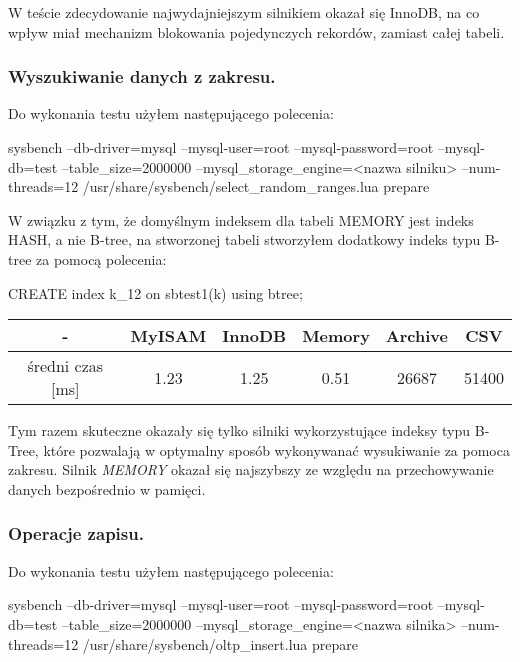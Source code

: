 W teście zdecydowanie najwydajniejszym silnikiem okazał się InnoDB, na co wpływ miał mechanizm blokowania pojedynczych rekordów, zamiast całej tabeli.

\subsubsection{Wyszukiwanie danych z zakresu.}

Do wykonania testu użyłem następującego polecenia:
\begin{spverbatim}
	sysbench --db-driver=mysql --mysql-user=root --mysql-password=root --mysql-db=test --table_size=2000000 --mysql_storage_engine=<nazwa silniku> --num-threads=12 /usr/share/sysbench/select_random_ranges.lua prepare
\end{spverbatim}
W związku z tym, że domyślnym indeksem dla tabeli MEMORY jest indeks HASH, a nie B-tree, na stworzonej tabeli stworzyłem dodatkowy indeks typu B-tree za pomocą polecenia:
\begin{spverbatim}
	CREATE index k_12 on sbtest1(k) using btree;
\end{spverbatim}
\begin{center}
	\begin{tabular}{ | c | c | c | c | c | c |}
		\hline
		- & MyISAM & InnoDB & Memory & Archive & CSV  \\ 
		\hline
		średni czas [ms] & 1.23 & 1.25 & 0.51 & 26687 & 51400 \\
		\hline
	\end{tabular}
\end{center}

Tym razem skuteczne okazały się tylko silniki wykorzystujące indeksy typu B-Tree, które pozwalają w optymalny sposób wykonywanać wysukiwanie za pomoca zakresu. Silnik \textit{MEMORY} okazał się najszybszy ze względu na przechowywanie danych bezpośrednio w pamięci.

\subsubsection{Operacje zapisu.}

Do wykonania testu użyłem następującego polecenia:
\begin{spverbatim}
	 sysbench --db-driver=mysql --mysql-user=root --mysql-password=root --mysql-db=test --table_size=2000000 --mysql_storage_engine=<nazwa silnika> --num-threads=12 /usr/share/sysbench/oltp_insert.lua prepare
\end{spverbatim}

